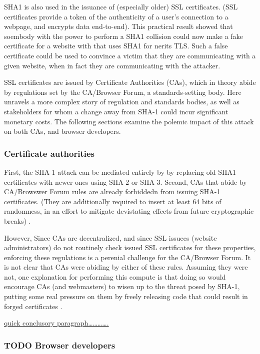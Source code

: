 \documentclass[sigconf]{acmart}
\begin{document}
SHA1 is also used in the issuance of (especially older) SSL certificates.
(SSL certificates
provide a token of the authenticity of a user's connection to a webpage,
and encrypts data end-to-end).
This practical result showed that soembody with the power to perform a SHA1 collision could
now make a fake certificate for a website with that uses SHA1 for nerits TLS.
Such a false certificate could
be used to convince a victim that they are communicating with a given website,
when in fact they are communicating with the attacker.

SSL certificates are issued by Certificate Authorities (CAs), which in theory abide by 
regulations set by the CA/Browser Forum, a standards-setting body.
Here unravels a more complex story of regulation and standards bodies,
as well as stakeholders for whom a change away from SHA-1 could incur significant monetary costs.
The following sections examine the polemic impact of this attack on both CAs, and browser developers. 

\subsubsection{Certificate authorities}
\label{sec:orgd3c4d05}

First, the SHA-1 attack can be mediated entirely by
by replacing old SHA1 certificates with newer ones using SHA-2 or SHA-3.
Second, CAs that abide by CA/Browswer Forum rules are already forbiddedn from issuing SHA-1 certificates. (They are additionally required to insert at least 64 bits of randomness, in an effort to mitigate devistating effects from future cryptographic breaks) \cite{Stevens2017}.

However, Since CAs are decentralized, and since SSL issuees (website administrators) do not routinely check issued SSL certificates for these properties, enforcing these regulations is a perenial challenge for the CA/Browser Forum. It is not clear that CAs were abiding by either of these rules.
Assuming they were not, one explanation for performing this compute is that doing so would encourage CAs (and webmasters) to wisen up to the threat posed by SHA-1,
putting some real pressure on them by freely releasing code that could result in forged certificates \cite{Stevens2017github}.

\uline{quick conclusory paragraph\ldots{}\ldots{}\ldots{}\ldots{}.}

\subsubsection{{\bfseries\sffamily TODO} Browser developers}
\label{sec:org46b8102}
\end{document}
